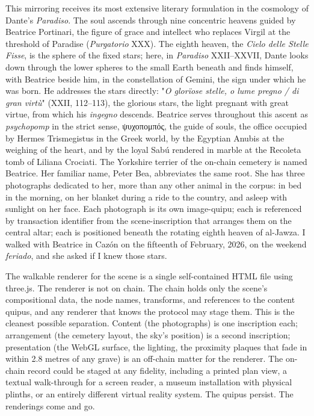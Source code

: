 \documentclass[11pt,openany]{book}
\begin{document}
This mirroring receives its most extensive literary formulation in the cosmology of Dante's \emph{Paradiso}. The soul ascends through nine concentric heavens guided by Beatrice Portinari, the figure of grace and intellect who replaces Virgil at the threshold of Paradise (\emph{Purgatorio} XXX). The eighth heaven, the \emph{Cielo delle Stelle Fisse}, is the sphere of the fixed stars; here, in \emph{Paradiso} XXII–XXVII, Dante looks down through the lower spheres to the small Earth beneath and finds himself, with Beatrice beside him, in the constellation of Gemini, the sign under which he was born. He addresses the stars directly: "\emph{O glorïose stelle, o lume pregno / di gran virtù}" (XXII, 112–113), the glorious stars, the light pregnant with great virtue, from which his \emph{ingegno} descends. Beatrice serves throughout this ascent as \emph{psychopomp} in the strict sense, ψυχοπομπός, the guide of souls, the office occupied by Hermes Trismegistus in the Greek world, by the Egyptian Anubis at the weighing of the heart, and by the loyal Sabú rendered in marble at the Recoleta tomb of Liliana Crociati. The Yorkshire terrier of the on-chain cemetery is named Beatrice. Her familiar name, Peter Bea, abbreviates the same root. She has three photographs dedicated to her, more than any other animal in the corpus: in bed in the morning, on her blanket during a ride to the country, and asleep with sunlight on her face. Each photograph is its own image-quipu; each is referenced by transaction identifier from the scene-inscription that arranges them on the central altar; each is positioned beneath the rotating eighth heaven of al-Jawza. I walked with Beatrice in Cazón on the fifteenth of February, 2026, on the weekend \emph{feriado}, and she asked if I knew those stars.

The walkable renderer for the scene is a single self-contained HTML file using three.js. The renderer is not on chain. The chain holds only the scene's compositional data, the node names, transforms, and references to the content quipus, and any renderer that knows the protocol may stage them. This is the cleanest possible separation. Content (the photographs) is one inscription each; arrangement (the cemetery layout, the sky's position) is a second inscription; presentation (the WebGL surface, the lighting, the proximity plaques that fade in within 2.8 metres of any grave) is an off-chain matter for the renderer. The on-chain record could be staged at any fidelity, including a printed plan view, a textual walk-through for a screen reader, a museum installation with physical plinths, or an entirely different virtual reality system. The quipus persist. The renderings come and go.
\end{document}
